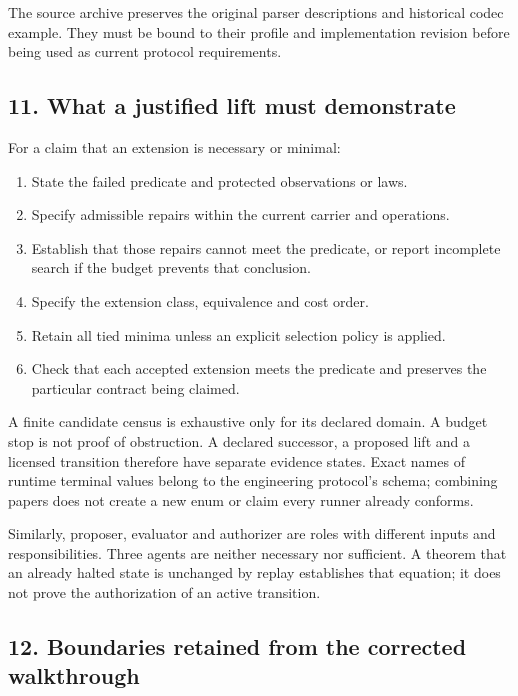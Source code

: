 \documentclass[
  11pt,
]{article}
\providecommand{\tightlist}{%
  \setlength{\itemsep}{0pt}\setlength{\parskip}{0pt}}
\begin{document}
The source archive preserves the original parser descriptions and
historical codec example. They must be bound to their profile and
implementation revision before being used as current protocol
requirements.

\subsection{11. What a justified lift must
demonstrate}\label{what-a-justified-lift-must-demonstrate}

For a claim that an extension is necessary or minimal:

\begin{enumerate}
\def\labelenumi{\arabic{enumi}.}
\tightlist
\item
  State the failed predicate and protected observations or laws.
\item
  Specify admissible repairs within the current carrier and operations.
\item
  Establish that those repairs cannot meet the predicate, or report
  incomplete search if the budget prevents that conclusion.
\item
  Specify the extension class, equivalence and cost order.
\item
  Retain all tied minima unless an explicit selection policy is applied.
\item
  Check that each accepted extension meets the predicate and preserves
  the particular contract being claimed.
\end{enumerate}

A finite candidate census is exhaustive only for its declared domain. A
budget stop is not proof of obstruction. A declared successor, a
proposed lift and a licensed transition therefore have separate evidence
states. Exact names of runtime terminal values belong to the engineering
protocol's schema; combining papers does not create a new enum or claim
every runner already conforms.

Similarly, proposer, evaluator and authorizer are roles with different
inputs and responsibilities. Three agents are neither necessary nor
sufficient. A theorem that an already halted state is unchanged by
replay establishes that equation; it does not prove the authorization of
an active transition.

\subsection{12. Boundaries retained from the corrected
walkthrough}\label{boundaries-retained-from-the-corrected-walkthrough}
\end{document}
